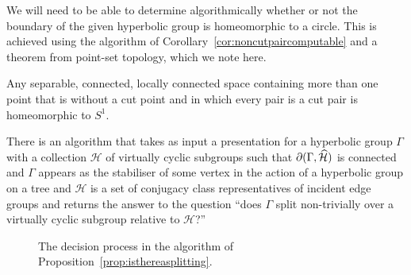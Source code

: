 We will need to be able to determine algorithmically whether or not the
boundary of the given hyperbolic group is homeomorphic to a circle. This is
achieved using the algorithm of Corollary~\ref{cor:noncutpaircomputable} and a
theorem from point-set topology, which we note here.

\begin{thm}\cite[II.2.13]{wilder49}\label{thm:topologyimpliescircle} Any
separable, connected, locally connected space containing more than one point
that is without a cut point and in which every pair is a cut pair is
homeomorphic to $S^1$.\end{thm}

\begin{prop}\label{prop:isthereasplitting} There is an algorithm that takes as
  input a presentation for a hyperbolic group $\Gamma$ with a collection
  $\mathcal{H}$ of virtually cyclic subgroups such that $\partial(\Gamma,
  \widehat{\mathcal{H}})$ is connected and $\Gamma$ appears as the stabiliser
  of some vertex in the action of a hyperbolic group on a tree and
  $\mathcal{H}$ is a set of conjugacy class representatives of incident edge
  groups and returns the answer to the question ``does $\Gamma$ split
non-trivially over a virtually cyclic subgroup relative to
$\mathcal{H}$?''\end{prop}

\begin{figure}
\centering

\caption{The decision process in the algorithm of Proposition~\ref{prop:isthereasplitting}.}
\end{figure}

